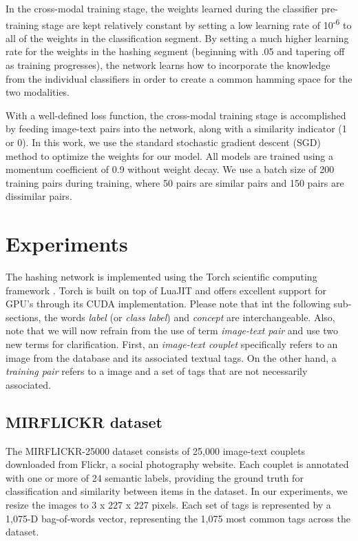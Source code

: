 \documentclass[letterpaper]{article}
\begin{document}
In the cross-modal training stage, the weights learned during the classifier pre-training stage are kept relatively constant by setting a low learning rate of 10\textsuperscript{-6} to all of the weights in the classification segment. By setting a much higher learning rate for the weights in the hashing segment (beginning with .05 and tapering off as training progresses), the network learns how to incorporate the knowledge from the individual classifiers in order to create a common hamming space for the two modalities.

With a well-defined loss function, the cross-modal training stage is accomplished by feeding image-text pairs into the network, along with a similarity indicator (1 or 0). In this work, we use the standard stochastic gradient descent (SGD)  method to optimize the weights for our model. All models are trained using a momentum coefficient of 0.9 without weight decay. We use a batch size of 200 training pairs during training, where 50 pairs are similar pairs and 150 pairs are dissimilar pairs.

\section{Experiments}

The hashing network is implemented using the Torch scientific computing framework \cite{torch}. Torch is built on top of LuaJIT and offers excellent support for GPU's through its CUDA implementation. Please note that int the following sub-sections, the words \emph{label} (or \emph{class label}) and \emph{concept} are interchangeable. Also, note that we will now refrain from the use of term \emph{image-text pair} and use two new terms for clarification. First, an \emph{image-text couplet} specifically refers to an image from the database and its associated textual tags. On the other hand, a \emph{training pair} refers to a image and a set of tags that are not necessarily associated. 

\subsection{MIRFLICKR dataset}

The MIRFLICKR-25000 dataset \cite{flickr} consists of 25,000 image-text couplets downloaded from Flickr, a social photography website. Each couplet is annotated with one or more of 24 semantic labels, providing the ground truth for classification and similarity between items in the dataset. In our experiments, we resize the images to 3 x 227 x 227 pixels. Each set of tags is represented by a 1,075-D bag-of-words vector, representing the 1,075 most common tags across the dataset.
\end{document}
